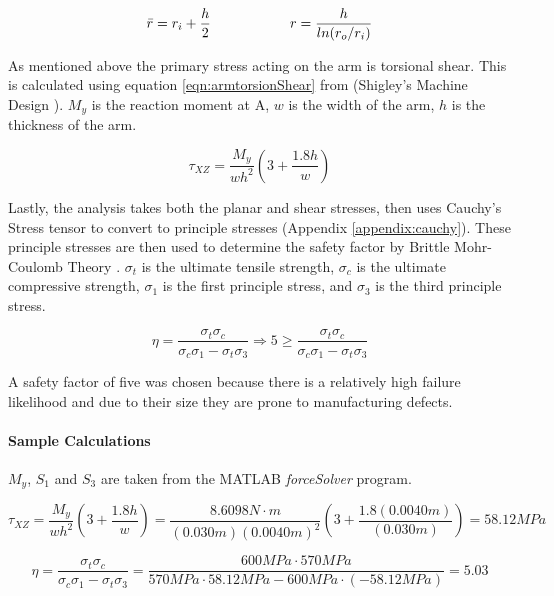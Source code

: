 \documentclass[../main.tex]{subfiles}
\begin{document}
\begin{equation} \label{eqn:armNeutralAxis}
\bar{r} = r_i + \frac{h}{2} \hspace{20mm}  r = \frac{h}{ln(r_o/r_i)}
\end{equation}

As mentioned above the primary stress acting on the arm is torsional shear. This is calculated using equation \ref{eqn:armtorsionShear} from {(Shigley's Machine Design \cite[102]{shigley})}. $M_y$ is the reaction moment at A, $w$ is the width of the arm, $h$ is the thickness of the arm.

\begin{equation} \label{eqn:armtorsionShear}
\tau_{XZ} = \dfrac{M_{y}}{wh^2}(3+\frac{1.8h}{w})
\end{equation}

Lastly, the analysis takes both the planar and shear stresses, then uses Cauchy's Stress tensor to convert to principle stresses (Appendix \ref{appendix:cauchy}). These principle stresses are then used to determine the safety factor by Brittle Mohr-Coulomb Theory \cite[227]{shigley}. $\sigma_t$ is the ultimate tensile strength, $\sigma_c$ is the ultimate compressive strength, $\sigma_1$ is the first principle stress, and $\sigma_3$ is the third principle stress.

\begin{equation}
\eta = \frac{\sigma_t\sigma_c} {\sigma_c\sigma_1 -\sigma_t\sigma_3} \Rightarrow 5 \geq \frac{\sigma_t\sigma_c} {\sigma_c\sigma_1 -\sigma_t\sigma_3}
\end{equation}

A safety factor of five was chosen because there is a relatively high failure likelihood and due to their size they are prone to manufacturing defects.

\paragraph*{Sample Calculations}
$M_y$, $S_1$ and $S_3$ are taken from the MATLAB \textit{forceSolver} program.

$$\tau_{XZ} = \dfrac{M_{y}}{wh^2}\left(3+\frac{1.8h}{w}\right)= \dfrac{8.6098N\cdot{}m}{(0.030m)(0.0040m)^2}\left(3+\frac{1.8(0.0040m)}{(0.030m)}\right)=58.12MPa$$

$$\eta = \frac{\sigma_t\sigma_c} {\sigma_c\sigma_1 -\sigma_t\sigma_3}=\frac{600MPa\cdot{}570MPa} {570MPa\cdot{}58.12MPa - 600MPa\cdot{}(-58.12MPa)}=5.03$$
\end{document}
